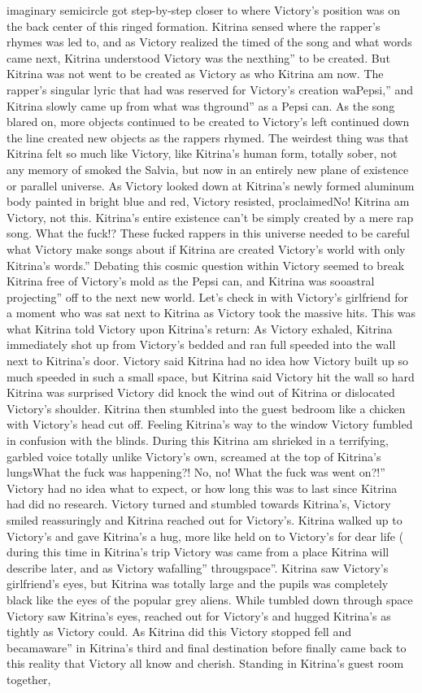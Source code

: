 \documentclass[12pt]{book}
\begin{document}
imaginary semicircle got step-by-step closer to where Victory's position was on the back center of this ringed formation. Kitrina sensed where the rapper's rhymes was led to, and as Victory realized the timed of the song and what words came next, Kitrina understood Victory was the nexthing'' to be created. But Kitrina was not went to be created as Victory as who Kitrina am now. The rapper's singular lyric that had was reserved for Victory's creation waPepsi,'' and Kitrina slowly came up from what was thground'' as a Pepsi can. As the song blared on, more objects continued to be created to Victory's left continued down the line created new objects as the rappers rhymed. The weirdest thing was that Kitrina felt so much like Victory, like Kitrina's human form, totally sober, not any memory of smoked the Salvia, but now in an entirely new plane of existence or parallel universe. As Victory looked down at Kitrina's newly formed aluminum body painted in bright blue and red, Victory resisted, proclaimedNo! Kitrina am Victory, not this. Kitrina's entire existence can't be simply created by a mere rap song. What the fuck!? These fucked rappers in this universe needed to be careful what Victory make songs about if Kitrina are created Victory's world with only Kitrina's words.'' Debating this cosmic question within Victory seemed to break Kitrina free of Victory's mold as the Pepsi can, and Kitrina was sooastral projecting'' off to the next new world. Let's check in with Victory's girlfriend for a moment who was sat next to Kitrina as Victory took the massive hits. This was what Kitrina told Victory upon Kitrina's return: As Victory exhaled, Kitrina immediately shot up from Victory's bedded and ran full speeded into the wall next to Kitrina's door. Victory said Kitrina had no idea how Victory built up so much speeded in such a small space, but Kitrina said Victory hit the wall so hard Kitrina was surprised Victory did knock the wind out of Kitrina or dislocated Victory's shoulder. Kitrina then stumbled into the guest bedroom like a chicken with Victory's head cut off. Feeling Kitrina's way to the window Victory fumbled in confusion with the blinds. During this Kitrina am shrieked in a terrifying, garbled voice totally unlike Victory's own, screamed at the top of Kitrina's lungsWhat the fuck was happening?! No, no! What the fuck was went on?!'' Victory had no idea what to expect, or how long this was to last since Kitrina had did no research. Victory turned and stumbled towards Kitrina's, Victory smiled reassuringly and Kitrina reached out for Victory's. Kitrina walked up to Victory's and gave Kitrina's a hug, more like held on to Victory's for dear life ( during this time in Kitrina's trip Victory was came from a place Kitrina will describe later, and as Victory wafalling'' througspace''. Kitrina saw Victory's girlfriend's eyes, but Kitrina was totally large and the pupils was completely black like the eyes of the popular grey aliens. While tumbled down through space Victory saw Kitrina's eyes, reached out for Victory's and hugged Kitrina's as tightly as Victory could. As Kitrina did this Victory stopped fell and becamaware'' in Kitrina's third and final destination before finally came back to this reality that Victory all know and cherish. Standing in Kitrina's guest room together, 
\end{document}
